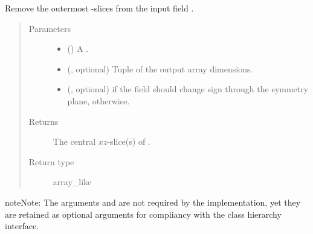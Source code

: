 \documentclass[letterpaper,10pt,english]{sphinxmanual}
\begin{document}
\begin{fulllineitems}

\begin{fulllineitems}
\label{\detokenize{api:dycore.horizontal_boundary_relaxed.RelaxedXZ.from_computational_to_physical_domain}}
Remove the  outermost -slices from the input field .
\begin{quote}\begin{description}
\item[{Parameters}] \leavevmode\begin{itemize}
\item {} 
 () \textendash{} A .

\item {} 
 (, optional) \textendash{} Tuple of the output array dimensions.

\item {} 
 (, optional) \textendash{}  if the field should change sign through the symmetry plane,  otherwise.

\end{itemize}

\item[{Returns}] \leavevmode
The central \(xz\)-slice(s) of .

\item[{Return type}] \leavevmode
array\_like

\end{description}\end{quote}

\begin{sphinxadmonition}{note}{Note:}
The arguments  and  are not required by the implementation,
yet they are retained as optional arguments for compliancy with the class hierarchy interface.
\end{sphinxadmonition}

\end{fulllineitems}


\end{fulllineitems}
\end{document}
